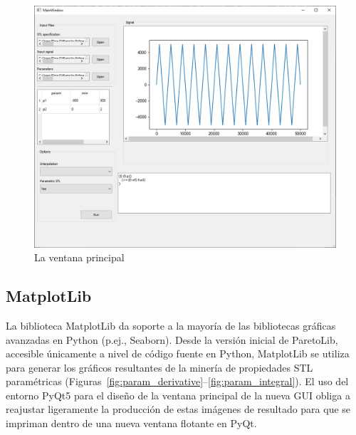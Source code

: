 \begin{figure}[htb]
\centering
  \includegraphics[width=1.0\linewidth]{images/gui} 
\caption{La ventana principal}
\label{fig:gui}
\end{figure}

 
 
 
 
\subsection{MatplotLib}
La biblioteca MatplotLib da soporte a la mayoría de las bibliotecas gráficas avanzadas en Python (p.ej., Seaborn). Desde la versión inicial de ParetoLib, accesible únicamente a nivel de código fuente en Python, MatplotLib se utiliza para generar los gráficos resultantes de la minería de propiedades STL paramétricas (Figuras~\ref{fig:param_derivative}--\ref{fig:param_integral}). El uso del entorno PyQt5 para el diseño de la ventana principal de la nueva GUI obliga a reajustar ligeramente la producción de estas imágenes de resultado para que se impriman dentro de una nueva ventana flotante en PyQt.
 
